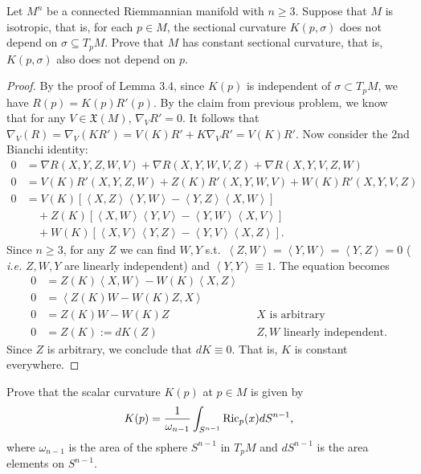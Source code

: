 \documentclass[12pt]{article}
\begin{document}
\begin{problem}
Let $ M^{n}$ be a connected Riemmannian manifold with $ n \geq 3$. Suppose that  $ M$ is isotropic, that is, for each $ p \in M$, the sectional curvature $ K(p, \sigma)$ does not depend on $ \sigma \subseteq T_pM$. Prove that $ M$ has constant sectional curvature, that is,  $ K(p, \sigma)$ also does not depend on $ p$. 
\end{problem}
\begin{proof}
By the proof of Lemma 3.4, since $ K(p)$ is independent of  $ \sigma \subset T_pM$, we have $ R(p) = K(p) R'(p)$. By the claim from previous problem, we know that for any $ V \in \mathfrak{X}(M)$, $ \nabla_V R' = 0$. It follows that $ \nabla_V (R) = \nabla_V(KR') = V(K)R' + K \nabla_VR' = V(K)R'$. Now consider the 2nd Bianchi identity:
\begin{align*}
	0&=\nabla R(X,Y,Z,W,V) + \nabla R(X,Y,W,V,Z) + \nabla R(X,Y,V,Z,W) \\
	0&=V(K)R'(X,Y,Z,W) + Z(K)R'(X,Y,W,V) + W(K) R'(X,Y,V,Z) \\
	0&=V(K)[\left\langle X,Z \right\rangle \left\langle Y,W \right\rangle - \left\langle Y,Z \right\rangle \left\langle X,W \right\rangle]\\
	 & \quad +Z(K) [\left\langle X,W \right\rangle \left\langle Y,V \right\rangle - \left\langle Y,W \right\rangle \left\langle X,V \right\rangle]  \\
	 &\quad + W(K) [\left\langle X,V \right\rangle \left\langle Y,Z \right\rangle - \left\langle Y,V \right\rangle \left\langle X,Z \right\rangle]  .
\end{align*}
Since $ n \geq 3$, for any  $Z$ we can find  $ W,Y$ s.t.\ $ \left\langle Z,W \right\rangle = \left\langle Y,W \right\rangle = \left\langle Y,Z \right\rangle = 0$ ( \emph{i.e.} $ Z,W,Y$ are linearly independent) and $ \left\langle Y,Y \right\rangle \equiv 1$. The equation becomes
\begin{align*}
	0 &= Z(K) \left\langle X,W \right\rangle - W(K) \left\langle X,Z \right\rangle \\
	0&= \left\langle Z(K)W- W(K)Z, X \right\rangle \\
	0 &= Z(K)W-W(K)Z && X \text{ is arbitrary} \\
	0 &= Z(K) := dK(Z) && Z,W \text{ linearly independent}  .
\end{align*}
Since $ Z$ is arbitrary, we conclude that  $ dK \equiv 0$. That is,  $ K$ is constant everywhere.
\end{proof}
\begin{problem}[4.9]
Prove that the scalar curvature $ K(p)$ at  $  p \in M$ is given by
\begin{align*}
	K(p) = \frac{1}{\omega_{n-1}} \int_{S^{n-1}} \operatorname{Ric}_p(x) dS^{n-1},
\end{align*}
where $ \omega_{n-1}$ is the area of the sphere $ S^{n-1}$ in $ T_pM$ and  $ dS^{n-1}$ is the area elements on $ S^{n-1}$.
\end{problem}
\end{document}
